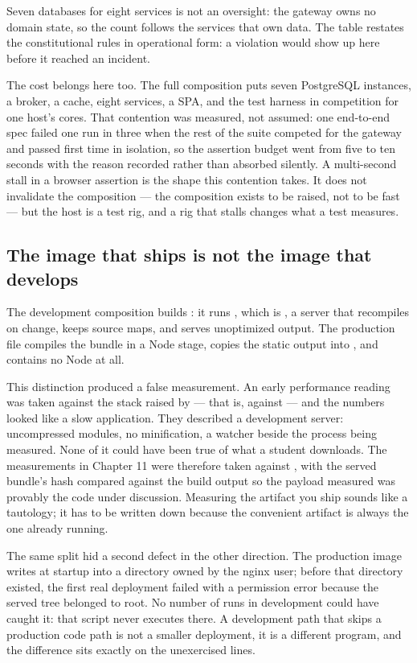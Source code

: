 Seven databases for eight services is not an oversight: the gateway owns no domain state, so the count
follows the services that own data. The table restates the constitutional rules in operational form: a
violation would show up here before it reached an incident.

The cost belongs here too. The full composition puts seven PostgreSQL instances, a broker, a cache,
eight services, a SPA, and the test harness in competition for one host's cores. That contention was
measured, not assumed: one end-to-end spec failed one run in three when the rest of the suite competed
for the gateway and passed first time in isolation, so the assertion budget went from five to ten
seconds with the reason recorded rather than absorbed silently. A multi-second stall in a browser
assertion is the shape this contention takes. It does not invalidate the composition — the composition
exists to be raised, not to be fast — but the host is a test rig, and a rig that stalls changes what a
test measures.

\subsection{The image that ships is not the image that develops}

The development composition builds : it runs ,
which is , a server that recompiles on change, keeps source maps, and serves
unoptimized output. The production file compiles the bundle in a Node stage, copies
the static output into , and contains no Node at all.

This distinction produced a false measurement. An early performance reading was taken against the
stack raised by  — that is, against  — and the numbers looked like a slow
application. They described a development server: uncompressed modules, no minification, a watcher
beside the process being measured. None of it could have been true of what a student downloads. The
measurements in Chapter 11 were therefore taken against , with the served
bundle's hash compared against the build output so the payload measured was provably the code under
discussion. Measuring the artifact you ship sounds like a tautology; it has to be written
down because the convenient artifact is always the one already running.

The same split hid a second defect in the other direction. The production image writes
 at startup into a directory owned by the nginx user; before that directory existed,
the first real deployment failed with a permission error because the served tree belonged to root. No
number of runs in development could have caught it: that script never executes there. A development
path that skips a production code path is not a smaller deployment, it is a different program, and the
difference sits exactly on the unexercised lines.

